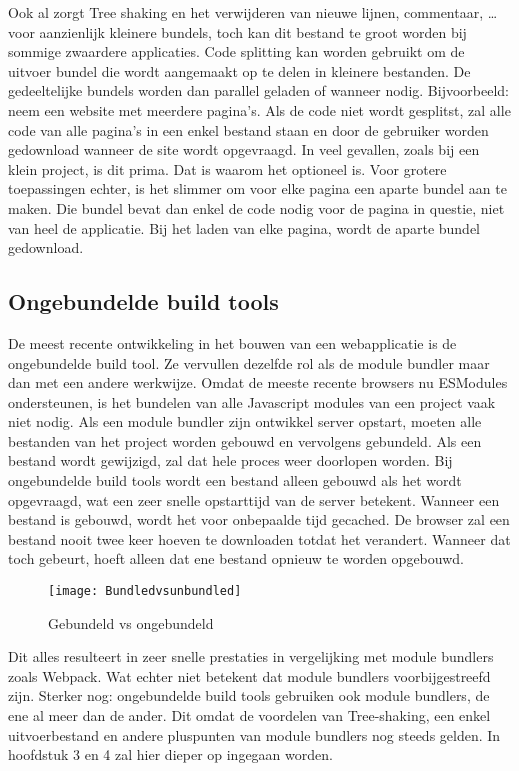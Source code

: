Ook al zorgt Tree shaking en het verwijderen van nieuwe lijnen, commentaar, … voor aanzienlijk kleinere bundels, toch kan dit bestand te groot worden bij sommige zwaardere applicaties. Code splitting kan worden gebruikt om de uitvoer bundel die wordt aangemaakt op te delen in kleinere bestanden. De gedeeltelijke bundels worden dan parallel geladen of wanneer nodig. Bijvoorbeeld: neem een website met meerdere pagina's. Als de code niet wordt gesplitst, zal alle code van alle pagina's in een enkel bestand staan en door de gebruiker worden gedownload wanneer de site wordt opgevraagd. In veel gevallen, zoals bij een klein project, is dit prima. Dat is waarom het optioneel is. Voor grotere toepassingen echter, is het slimmer om voor elke pagina een aparte bundel aan te maken. Die bundel bevat dan enkel de code nodig voor de pagina in questie, niet van heel de applicatie. Bij het laden van elke pagina, wordt de aparte bundel gedownload.

\subsection{Ongebundelde build tools}
De meest recente ontwikkeling in het bouwen van een webapplicatie is de ongebundelde build tool. Ze vervullen dezelfde rol als de module bundler maar dan met een andere werkwijze. Omdat de meeste recente browsers nu ESModules ondersteunen, is het bundelen van alle \gls{Javascript} modules van een project vaak niet nodig. Als een module bundler zijn ontwikkel server opstart, moeten alle bestanden van het project worden gebouwd en vervolgens gebundeld. Als een bestand wordt gewijzigd, zal dat hele proces weer doorlopen worden. Bij ongebundelde build tools wordt een bestand alleen gebouwd als het wordt opgevraagd, wat een zeer snelle opstarttijd van de server betekent. Wanneer een bestand is gebouwd, wordt het voor onbepaalde tijd gecached. De browser zal een bestand nooit twee keer hoeven te downloaden totdat het verandert. Wanneer dat toch gebeurt, hoeft alleen dat ene bestand opnieuw te worden opgebouwd. 

\begin{figure}[h]
\texttt{[image: Bundledvsunbundled]}
   \caption{Gebundeld vs ongebundeld \autocite{snowpack-no-date}}
\end{figure}

Dit alles resulteert in zeer snelle prestaties in vergelijking met module bundlers zoals Webpack. Wat echter niet betekent dat module bundlers voorbijgestreefd zijn. Sterker nog: ongebundelde build tools gebruiken ook module bundlers, de ene al meer dan de ander. Dit omdat de voordelen van Tree-shaking, een enkel uitvoerbestand en andere pluspunten van module bundlers nog steeds gelden. In hoofdstuk 3 en 4 zal hier dieper op ingegaan worden.

